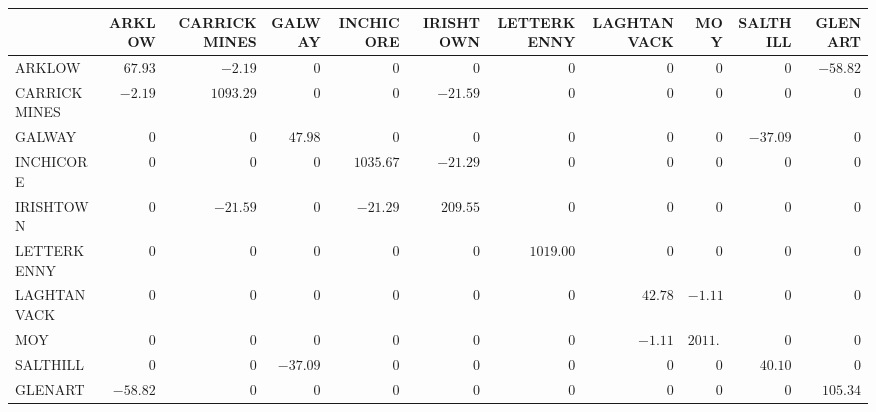 \setlength{\tabcolsep}{3pt}\renewcommand{\arraystretch}{1.05}
\begin{tabular}{l|rrrrrrrrrr}
{\tiny } & {\tiny ARKLOW} & {\tiny CARRICKMINES} & {\tiny GALWAY} & {\tiny INCHICORE} & {\tiny IRISHTOWN} & {\tiny LETTERKENNY} & {\tiny LAGHTANVACK} & {\tiny MOY} & {\tiny SALTHILL} & {\tiny GLENART}\\ \hline
{\tiny ARKLOW} & $67.93$ & $-2.19$ & $0$ & $0$ & $0$ & $0$ & $0$ & $0$ & $0$ & $-58.82$\\
{\tiny CARRICKMINES} & $-2.19$ & $1093.29$ & $0$ & $0$ & $-21.59$ & $0$ & $0$ & $0$ & $0$ & $0$\\
{\tiny GALWAY} & $0$ & $0$ & $47.98$ & $0$ & $0$ & $0$ & $0$ & $0$ & $-37.09$ & $0$\\
{\tiny INCHICORE} & $0$ & $0$ & $0$ & $1035.67$ & $-21.29$ & $0$ & $0$ & $0$ & $0$ & $0$\\
{\tiny IRISHTOWN} & $0$ & $-21.59$ & $0$ & $-21.29$ & $209.55$ & $0$ & $0$ & $0$ & $0$ & $0$\\
{\tiny LETTERKENNY} & $0$ & $0$ & $0$ & $0$ & $0$ & $1019.00$ & $0$ & $0$ & $0$ & $0$\\
{\tiny LAGHTANVACK} & $0$ & $0$ & $0$ & $0$ & $0$ & $0$ & $42.78$ & $-1.11$ & $0$ & $0$\\
{\tiny MOY} & $0$ & $0$ & $0$ & $0$ & $0$ & $0$ & $-1.11$ & $2011.92$ & $0$ & $0$\\
{\tiny SALTHILL} & $0$ & $0$ & $-37.09$ & $0$ & $0$ & $0$ & $0$ & $0$ & $40.10$ & $0$\\
{\tiny GLENART} & $-58.82$ & $0$ & $0$ & $0$ & $0$ & $0$ & $0$ & $0$ & $0$ & $105.34$
\end{tabular}
